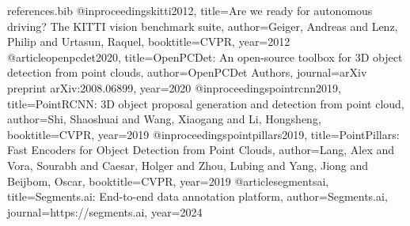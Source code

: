 \documentclass[a4paper,12pt]{article}
\begin{document}
\begin{filecontents*}{references.bib}
@inproceedings{kitti2012,
  title={Are we ready for autonomous driving? The KITTI vision benchmark suite},
  author={Geiger, Andreas and Lenz, Philip and Urtasun, Raquel},
  booktitle={CVPR},
  year={2012}
}
@article{openpcdet2020,
  title={OpenPCDet: An open-source toolbox for 3D object detection from point clouds},
  author={OpenPCDet Authors},
  journal={arXiv preprint arXiv:2008.06899},
  year={2020}
}
@inproceedings{pointrcnn2019,
  title={PointRCNN: 3D object proposal generation and detection from point cloud},
  author={Shi, Shaoshuai and Wang, Xiaogang and Li, Hongsheng},
  booktitle={CVPR},
  year={2019}
}
@inproceedings{pointpillars2019,
  title={PointPillars: Fast Encoders for Object Detection from Point Clouds},
  author={Lang, Alex and Vora, Sourabh and Caesar, Holger and Zhou, Lubing and Yang, Jiong and Beijbom, Oscar},
  booktitle={CVPR},
  year={2019}
}
@article{segmentsai,
  title={Segments.ai: End-to-end data annotation platform},
  author={Segments.ai},
  journal={https://segments.ai},
  year={2024}
}
\end{filecontents*}



\end{document}
